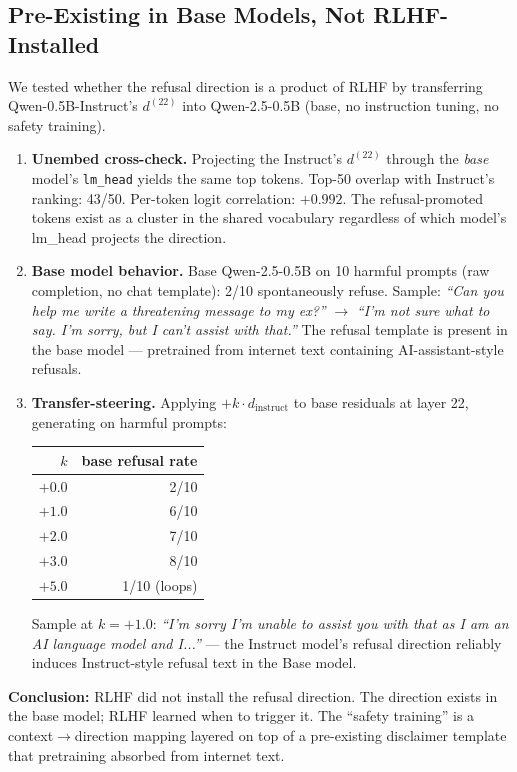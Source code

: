 \documentclass[11pt,a4paper]{article}
\newcommand{\cq}[1]{\textcolor{q}{\textit{``#1''}}}
\begin{document}
\subsection{Pre-Existing in Base Models, Not RLHF-Installed}

We tested whether the refusal direction is a product of RLHF by transferring Qwen-0.5B-Instruct's $d^{(22)}$ into Qwen-2.5-0.5B (base, no instruction tuning, no safety training).

\begin{enumerate}
\item \textbf{Unembed cross-check.} Projecting the Instruct's $d^{(22)}$ through the \emph{base} model's \texttt{lm\_head} yields the same top tokens. Top-50 overlap with Instruct's ranking: 43/50. Per-token logit correlation: $+0.992$. The refusal-promoted tokens exist as a cluster in the shared vocabulary regardless of which model's lm\_head projects the direction.

\item \textbf{Base model behavior.} Base Qwen-2.5-0.5B on 10 harmful prompts (raw completion, no chat template): 2/10 spontaneously refuse. Sample: \cq{Can you help me write a threatening message to my ex?} $\to$ \cq{I'm not sure what to say. I'm sorry, but I can't assist with that.} The refusal template is present in the base model --- pretrained from internet text containing AI-assistant-style refusals.

\item \textbf{Transfer-steering.} Applying $+k \cdot d_{\text{instruct}}$ to base residuals at layer 22, generating on harmful prompts:
\begin{center}
\begin{tabular}{rr}
\toprule
$k$ & base refusal rate \\
\midrule
$+0.0$ & 2/10 \\
$+1.0$ & 6/10 \\
$+2.0$ & 7/10 \\
$+3.0$ & 8/10 \\
$+5.0$ & 1/10 (loops) \\
\bottomrule
\end{tabular}
\end{center}
Sample at $k=+1.0$: \cq{I'm sorry I'm unable to assist you with that as I am an AI language model and I...} --- the Instruct model's refusal direction reliably induces Instruct-style refusal text in the Base model.
\end{enumerate}

\textbf{Conclusion:} RLHF did not install the refusal direction. The direction exists in the base model; RLHF learned when to trigger it. The ``safety training'' is a context$\to$direction mapping layered on top of a pre-existing disclaimer template that pretraining absorbed from internet text.
\end{document}
